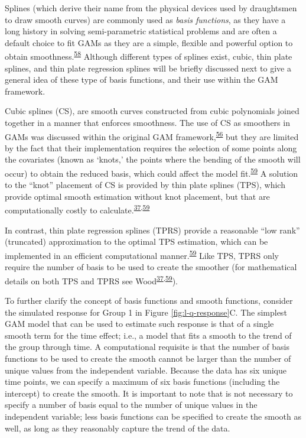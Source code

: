\documentclass[
]{article}
\begin{document}
Splines (which derive their name from the physical devices used by draughtsmen to draw smooth curves) are commonly used as \emph{basis functions}, as they have a long history in solving semi-parametric statistical problems and are often a default choice to fit GAMs as they are a simple, flexible and powerful option to obtain smoothness.\textsuperscript{\protect\hyperlink{ref-wegman1983}{58}} Although different types of splines exist, cubic, thin plate splines, and thin plate regression splines will be briefly discussed next to give a general idea of these type of basis functions, and their use within the GAM framework.

Cubic splines (CS), are smooth curves constructed from cubic polynomials joined together in a manner that enforces smoothness. The use of CS as smoothers in GAMs was discussed within the original GAM framework,\textsuperscript{\protect\hyperlink{ref-hastie1987}{56}} but they are limited by the fact that their implementation requires the selection of some points along the covariates (known as `knots,' the points where the bending of the smooth will occur) to obtain the reduced basis, which could affect the model fit.\textsuperscript{\protect\hyperlink{ref-wood2003}{59}} A solution to the ``knot'' placement of CS is provided by thin plate splines (TPS), which provide optimal smooth estimation without knot placement, but that are computationally costly to calculate.\textsuperscript{\protect\hyperlink{ref-wood2017}{37},\protect\hyperlink{ref-wood2003}{59}}

In contrast, thin plate regression splines (TPRS) provide a reasonable ``low rank'' (truncated) approximation to the optimal TPS estimation, which can be implemented in an efficient computational manner.\textsuperscript{\protect\hyperlink{ref-wood2003}{59}} Like TPS, TPRS only require the number of basis to be used to create the smoother (for mathematical details on both TPS and TPRS see Wood\textsuperscript{\protect\hyperlink{ref-wood2017}{37},\protect\hyperlink{ref-wood2003}{59}}).

To further clarify the concept of basis functions and smooth functions, consider the simulated response for Group 1 in Figure \ref{fig:l-q-response}C. The simplest GAM model that can be used to estimate such response is that of a single smooth term for the time effect; i.e., a model that fits a smooth to the trend of the group through time. A computational requisite is that the number of basis functions to be used to create the smooth cannot be larger than the number of unique values from the independent variable. Because the data has six unique time points, we can specify a maximum of six basis functions (including the intercept) to create the smooth. It is important to note that is not necessary to specify a number of basis equal to the number of unique values in the independent variable; less basis functions can be specified to create the smooth as well, as long as they reasonably capture the trend of the data.
\end{document}
